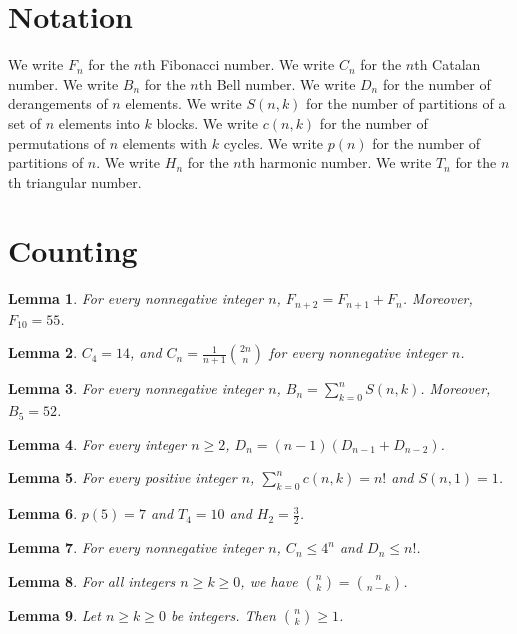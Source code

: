 \documentclass{article}
\newtheorem{lemma}{Lemma}
\begin{document}
\section{Notation}

We write $F_n$ for the $n$th Fibonacci number.
We write $C_n$ for the $n$th Catalan number.
We write $B_n$ for the $n$th Bell number.
We write $D_n$ for the number of derangements of $n$ elements.
We write $S(n,k)$ for the number of partitions of a set of $n$ elements into $k$ blocks.
We write $c(n,k)$ for the number of permutations of $n$ elements with $k$ cycles.
We write $p(n)$ for the number of partitions of $n$.
We write $H_n$ for the $n$th harmonic number.
We write $T_n$ for the $n$th triangular number.

\section{Counting}

\begin{lemma}\label{fibonacci}
For every nonnegative integer $n$, $F_{n+2}=F_{n+1}+F_n$. Moreover, $F_{10}=55$.
\end{lemma}

\begin{lemma}\label{catalan}
$C_4=14$, and $C_{n}=\frac{1}{n+1}\binom{2n}{n}$ for every nonnegative integer $n$.
\end{lemma}

\begin{lemma}\label{bell}
For every nonnegative integer $n$, $B_n=\sum_{k=0}^{n}S(n,k)$. Moreover, $B_5=52$.
\end{lemma}

\begin{lemma}\label{derangements}
For every integer $n\ge2$, $D_n=(n-1)(D_{n-1}+D_{n-2})$.
\end{lemma}

\begin{lemma}\label{stirling}
For every positive integer $n$, $\sum_{k=0}^{n}c(n,k)=n!$ and $S(n,1)=1$.
\end{lemma}

\begin{lemma}\label{partitions}
$p(5)=7$ and $T_4=10$ and $H_2=\frac32$.
\end{lemma}

\begin{lemma}\label{words}
For every nonnegative integer $n$, $C_n\le4^n$ and $D_n\le n!$.
\end{lemma}

\begin{lemma}\label{binomial-chain}
For all integers $n\ge k\ge0$, we have $\binom{n}{k}=\binom{n}{n-k}$.
\end{lemma}

\begin{lemma}\label{binomial-let-chain}
Let $n\ge k\ge0$ be integers. Then $\binom{n}{k}\ge1$.
\end{lemma}
\end{document}
